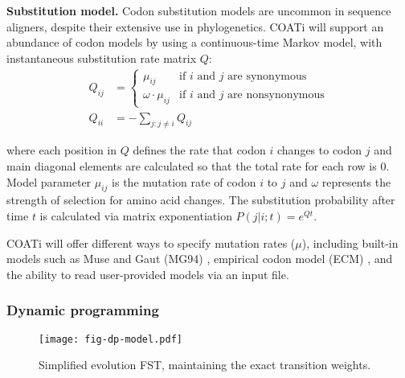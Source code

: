 \textbf{Substitution model.}
Codon substitution models are uncommon in sequence aligners, despite their
extensive use in phylogenetics.
COATi will support an abundance of codon models by using a continuous-time
Markov model, with instantaneous substitution rate matrix $Q$:
\begin{align*} Q_{ij} &= \begin{cases}
    \mu_{ij} & \text{if $i$ and $j$ are synonymous}\\
    \omega \cdot \mu_{ij} & \text{if $i$ and $j$ are nonsynonymous}
    \end{cases}\\[10pt]
   Q_{ii} &= -\sum_{j:j \neq i} Q_{ij}
\end{align*}

where each position in $Q$ defines the rate that codon $i$ changes to codon $j$
and main diagonal elements are calculated so that the total rate for each row
is 0.
Model parameter $\mu_{ij}$ is the mutation rate of codon $i$ to $j$ and $\omega$
represents the strength of selection for amino acid changes.
The substitution probability after time $t$ is calculated via matrix
exponentiation $P(j|i;t) = e^{Qt}$.

COATi will offer different ways to specify mutation rates ($\mu$), including
built-in models such as Muse and Gaut (MG94) \parencite{muse_gaut_1994},
empirical codon model (ECM) \parencite{kosiol_ECM_2007}, and the ability to read
user-provided models via an input file.


\vspace{1em}

\subsubsection{Dynamic programming}

\begin{wrapfigure}{r}{0.5\textwidth}
    \vspace{-3em}
    \centering
    \texttt{[image: fig-dp-model.pdf]}
    \caption{Simplified evolution FST, maintaining the exact transition weights.}
    \label{fig:dp-model}
\end{wrapfigure}

